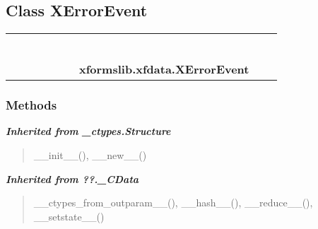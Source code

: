 
\subsection{Class XErrorEvent}

    \label{xformslib:xfdata:XErrorEvent}
\begin{tabular}{cccccccccc}
\multicolumn{2}{r}{\settowidth{\BCL}{object}\multirow{2}{\BCL}{object}}
&&
&&
&&
  \\\cline{3-3}
  &&\multicolumn{1}{c|}{}
&&
&&
&&
  \\
\multicolumn{4}{r}{\settowidth{\BCL}{??.\_CData}\multirow{2}{\BCL}{??.\_CData}}
&&
&&
  \\\cline{5-5}
  &&&&\multicolumn{1}{c|}{}
&&
&&
  \\
\multicolumn{6}{r}{\settowidth{\BCL}{\_ctypes.Structure}\multirow{2}{\BCL}{\_ctypes.Structure}}
&&
  \\\cline{7-7}
  &&&&&&\multicolumn{1}{c|}{}
&&
  \\
&&&&&&\multicolumn{2}{l}{\textbf{xformslib.xfdata.XErrorEvent}}
\end{tabular}



  \subsubsection{Methods}


\large{\textbf{\textit{Inherited from \_ctypes.Structure}}}

\begin{quote}
\_\_init\_\_(), \_\_new\_\_()
\end{quote}

\large{\textbf{\textit{Inherited from ??.\_CData}}}

\begin{quote}
\_\_ctypes\_from\_outparam\_\_(), \_\_hash\_\_(), \_\_reduce\_\_(), \_\_setstate\_\_()
\end{quote}

